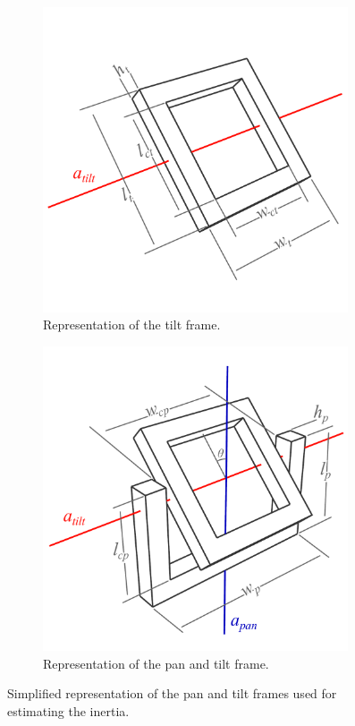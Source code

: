 \documentclass[../../main.tex]{subfiles}
\begin{document}
\begin{figure}
\begin{subfigure}{0.49\textwidth}
    \includegraphics[width = 0.99\textwidth]{Sections/System_Modelling/Images/tiltFrameDrawing.pdf}
    \caption{Representation of the tilt frame.}
    \label{fig:drawingTiltFrame}
\end{subfigure}\hfill
\begin{subfigure}{0.49\textwidth}
    \includegraphics[width = 0.99\textwidth]{Sections/System_Modelling/Images/panFrameDrawing.pdf}
    \caption{Representation of the pan and tilt frame.}
    \label{fig:drawingPanFrame}
\end{subfigure}
\caption{Simplified representation of the pan and tilt frames used for estimating the inertia.}
\label{fig:DrawingFrames}
\end{figure}
\end{document}
